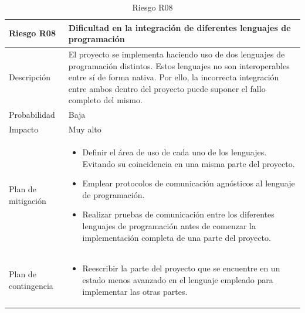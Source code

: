 \begin{table}[H]
	\centering
	\footnotesize
	\begin{tabularx}{\textwidth}{|l|X|}
		\hline
		\rowcolor[HTML]{C0C0C0} 
		\textbf{Riesgo R08}  & \textbf{Dificultad en la integración de diferentes lenguajes de programación} \\ \hline
		Descripción          & El proyecto se implementa haciendo uso de dos lenguajes de programación distintos. Estos lenguajes no son interoperables entre sí de forma nativa. Por ello, la incorrecta integración entre ambos dentro del proyecto puede suponer el fallo completo del mismo. \\ \hline
		Probabilidad         & Baja \\ \hline
		Impacto              & Muy alto \\ \hline
		Plan de mitigación   & \begin{minipage}[t]{\linewidth}
			\begin{itemize}[leftmargin=*, noitemsep]
				\item Definir el área de uso de cada uno de los lenguajes. Evitando su coincidencia en una misma parte del proyecto.
				\item Emplear protocolos de comunicación agnósticos al lenguaje de programación.
				\item Realizar pruebas de comunicación entre los diferentes lenguajes de programación antes de comenzar la implementación completa de una parte del proyecto.
			\end{itemize}
		\end{minipage} \\ \hline
		Plan de contingencia & \begin{minipage}[t]{\linewidth}
			\begin{itemize}[leftmargin=*, noitemsep]
				\item Reescribir la parte del proyecto que se encuentre en un estado menos avanzado en el lenguaje empleado para implementar las otras partes.
			\end{itemize}
		\end{minipage} \\ \hline
	\end{tabularx}
	\caption{Riesgo R08}
	\label{tab:riesgo_8}
\end{table}

